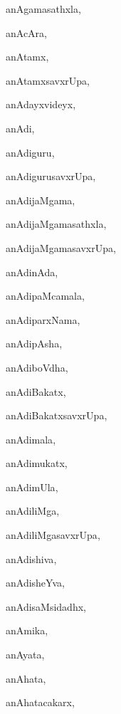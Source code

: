 \begin{multicols}{3}
{\noindent
{anAgamasathxla}, \pageref{anAgamasathxla}

\noindent
{anAcAra}, \pageref{anAcAra}

\noindent
{anAtamx}, \pageref{anAtamx}

\noindent
{anAtamxsavxrUpa}, \pageref{anAtamxsavxrUpa}

\noindent
{anAdayxvideyx}, \pageref{anAdayxvideyx}

\noindent
{anAdi}, \pageref{anAdi}

\noindent
{anAdiguru}, \pageref{anAdiguru}

\noindent
{anAdigurusavxrUpa}, \pageref{anAdigurusavxrUpa}

\noindent
{anAdijaMgama}, \pageref{anAdijaMgama}

\noindent
{anAdijaMgamasathxla}, \pageref{anAdijaMgamasathxla}

\noindent
{anAdijaMgamasavxrUpa}, \pageref{anAdijaMgamasavxrUpa}

\noindent
{anAdinAda}, \pageref{anAdinAda}

\noindent
{anAdipaMcamala}, \pageref{anAdipaMcamala}

\noindent
{anAdiparxNama}, \pageref{anAdiparxNama}

\noindent
{anAdipAsha}, \pageref{anAdipAsha}

\noindent
{anAdiboVdha}, \pageref{anAdiboVdha}

\noindent
{anAdiBakatx}, \pageref{anAdiBakatx}

\noindent
{anAdiBakatxsavxrUpa}, \pageref{anAdiBakatxsavxrUpa}

\noindent
{anAdimala}, \pageref{anAdimala}

\noindent
{anAdimukatx}, \pageref{anAdimukatx}

\noindent
{anAdimUla}, \pageref{anAdimUla}

\noindent
{anAdiliMga}, \pageref{anAdiliMga}

\noindent
{anAdiliMgasavxrUpa}, \pageref{anAdiliMgasavxrUpa}

\noindent
{anAdishiva}, \pageref{anAdishiva}

\noindent
{anAdisheYva}, \pageref{anAdisheYva}

\noindent
{anAdisaMsidadhx}, \pageref{anAdisaMsidadhx}

\noindent
{anAmika}, \pageref{anAmika}

\noindent
{anAyata}, \pageref{anAyata}

\noindent
{anAhata}, \pageref{anAhata}

\noindent
{anAhatacakarx}, \pageref{anAhatacakarx}

}
\end{multicols}
